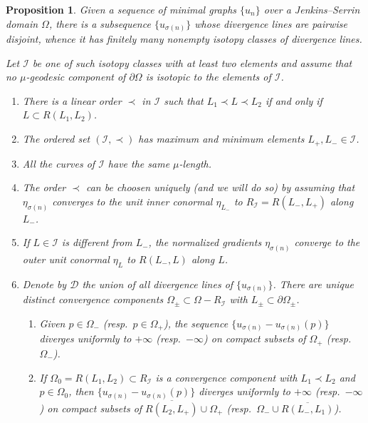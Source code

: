 \documentclass[a4paper,10pt,reqno]{amsart}
\newcommand{\sm}{-}
\newtheorem{proposition}[theorem]{Proposition}
\theoremstyle{definition}
\theoremstyle{remark}
\numberwithin{equation}{section}
\begin{document}
\begin{proposition}\label{prop:disjoint-lines}
Given a sequence of minimal graphs $\{u_n\}$ over a Jenkins--Serrin domain $\Omega$, there is a subsequence $\{u_{\sigma(n)}\}$ whose divergence lines are pairwise disjoint, whence it has finitely many nonempty isotopy classes of divergence lines. 

Let $\mathcal I$ be one of such isotopy classes with at least two elements and assume that no $\mu$-geodesic component of $\partial\Omega$ is isotopic to the elements of $\mathcal I$. 
\begin{enumerate}[label=\emph{(\arabic*)}]
	\item There is a linear order $\prec$ in $\mathcal I$ such that $L_1\prec L\prec L_2$ if and only if $L\subset R(L_1,L_2)$.
	\item The ordered set $(\mathcal I,\prec)$ has maximum and minimum elements $L_+,L_-\in\mathcal I$.
	\item All the curves of $\mathcal I$ have the same $\mu$-length.
	\item The order $\prec$ can be choosen uniquely (and we will do so) by assuming that $\eta_{\sigma(n)}$ converges to the unit inner conormal $\eta_{L_-}$ to $R_{\mathcal I}=R(L_-,L_+)$ along $L_-$. 
	\item If $L\in\mathcal I$ is different from $L_-$, the normalized gradients $\eta_{\sigma(n)}$ converge to the outer unit conormal $\eta_L$ to $R(L_-,L)$ along $L$.
	\item Denote by $\mathcal D$ the union of all divergence lines of $\{u_{\sigma(n)}\}$. There are unique distinct convergence components $\Omega_\pm\subset\Omega\sm R_\mathcal I$ with $L_\pm\subset\partial\Omega_\pm$.
	\begin{enumerate}[label=\emph{(\alph*)}]
		\item Given $p\in\Omega_-$ (resp.\ $p\in\Omega_+$), the sequence $\{u_{\sigma(n)}-u_{\sigma(n)}(p)\}$ diverges uniformly to $+\infty$ (resp.\ $-\infty$) on compact subsets of $\Omega_+$ (resp.\ $\Omega_-$).
		\item If $\Omega_0=R(L_1,L_2)\subset R_\mathcal I$ is a convergence component with $L_1\prec L_2$ and $p\in\Omega_0$, then $\{u_{\sigma(n)}-u_{\sigma(n)}(p)\}$ diverges uniformly to $+\infty$ (resp.\ $-\infty$) on compact subsets of $\overline{R(L_2,L_+)}\cup\Omega_+$ (resp.\ $\Omega_-\cup\overline{R(L_-,L_1)}$).
	\end{enumerate}
\end{enumerate}
\end{proposition}
\end{document}
